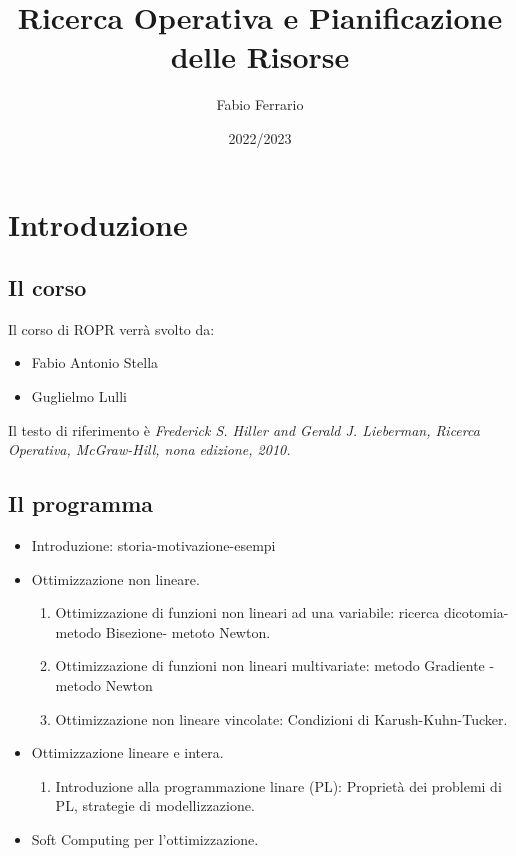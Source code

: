 \documentclass[12pt, a4paper, openany]{book}
\begin{document}
\title{Ricerca Operativa e Pianificazione delle Risorse}
\author{Fabio Ferrario}
\date{2022/2023}
\maketitle

\tableofcontents

\chapter{Introduzione}

\section{Il corso}
Il corso di ROPR verrà svolto da:
\begin{itemize}
    \item Fabio Antonio Stella
    \item Guglielmo Lulli
\end{itemize}

Il testo di riferimento è \emph{Frederick S. Hiller and Gerald J. Lieberman, Ricerca Operativa, McGraw-Hill, nona edizione, 2010.}


\section{Il programma}

\begin{itemize}
    \item Introduzione: storia-motivazione-esempi

    \item Ottimizzazione non lineare.
    \begin{enumerate}
        \item Ottimizzazione di funzioni non lineari ad una variabile: ricerca dicotomia-metodo Bisezione- metoto Newton.
        \item Ottimizzazione di funzioni non lineari multivariate: metodo Gradiente - metodo Newton
        \item Ottimizzazione non lineare vincolate: Condizioni di Karush-Kuhn-Tucker.
    \end{enumerate}
    \item Ottimizzazione lineare e intera.
    \begin{enumerate}
        \item Introduzione alla programmazione linare (PL): Proprietà dei problemi di PL, strategie di modellizzazione.
    \end{enumerate}
    \item Soft Computing per l'ottimizzazione.
\end{itemize}
\end{document}
